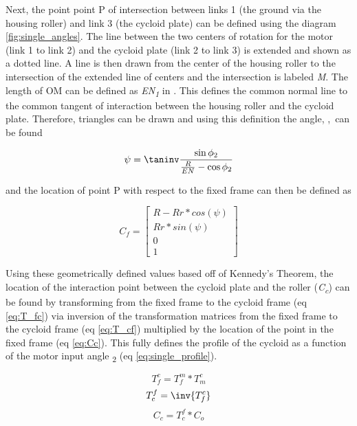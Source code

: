 Next, the point point P of intersection between links 1 (the ground via the housing roller) and link 3 (the cycloid plate) can be defined using the diagram \ref{fig:single_angles}. The line between the two centers of rotation for the motor (link 1 to link 2) and the cycloid plate (link 2 to link 3) is extended and shown as a dotted line. A line is then drawn from the center of the housing roller to the intersection of the extended line of centers and the intersection is labeled \textit{M}. The length of OM can be defined as \textit{EN\textsubscript{1}} in \cite{ref:on_the_lobe}. This defines the common normal line to the common tangent of interaction between the housing roller and the cycloid plate. Therefore, triangles can be drawn and using this definition the angle, \textpsi,\ can be found 

\begin{equation} \label{eq:psi}
\psi = \taninv\frac{\sin\phi_2}{\frac{R}{EN} - \cos{\phi_2}}
\end{equation}

and the location of point P with respect to the fixed frame can then be defined as 

\begin{equation} \label{eq:Cf}
C_f = \left[\begin{array}{c}
		R-Rr*cos(\psi)\\
		Rr*sin(\psi)\\
		0\\
		1
		\end{array} \right]
\end{equation}

Using these geometrically defined values based off of Kennedy's Theorem, the location of the interaction point between the cycloid plate and the roller (\textit{C\textsubscript{c}}) can be found by transforming from the fixed frame to the cycloid frame (eq \ref{eq:T_fc}) via inversion of the transformation matrices from the fixed frame to the cycloid frame (eq \ref{eq:T_cf}) multiplied by the location of the point in the fixed frame (eq \ref{eq:Cc}). This fully defines the profile of the cycloid as a function of the motor input angle \textphi\textsubscript{2} (eq \ref{eq:single_profile}).

\begin{equation} \label{eq:T_fc}
T_f^c = T_f^m * T_m^c 
\end{equation}
\begin{equation} \label{eq:T_cf}
T_c^f = \inv{T_f^c}
\end{equation}
\begin{equation} \label{eq:Cc}
C_c = T_c^f * C_o
\end{equation}

